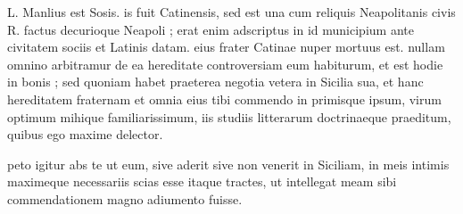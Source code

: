 


 L. Manlius est Sosis. is fuit Catinensis, sed est una cum reliquis Neapolitanis civis R. factus decurioque Neapoli ; erat enim adscriptus in id municipium ante civitatem sociis et Latinis datam. eius frater Catinae nuper mortuus est. nullam omnino arbitramur de ea hereditate controversiam eum habiturum, et est hodie in bonis ; sed quoniam habet praeterea negotia vetera in Sicilia sua, et hanc hereditatem fraternam et omnia eius tibi commendo in primisque ipsum, virum optimum mihique familiarissimum, iis studiis litterarum doctrinaeque praeditum, quibus ego maxime delector.

 peto igitur abs te ut eum, sive aderit sive non venerit in Siciliam, in meis intimis maximeque necessariis scias esse itaque tractes, ut intellegat meam sibi commendationem magno adiumento fuisse.

